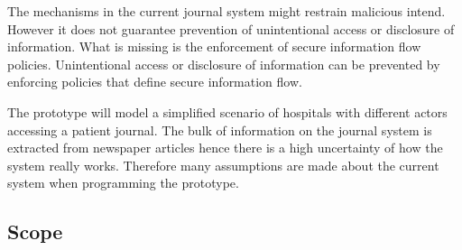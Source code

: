 The mechanisms in the current journal system might restrain malicious intend. However it does not guarantee prevention of unintentional access or disclosure of information\cite{Harman2012}. 
What is missing is the enforcement of secure information flow policies. Unintentional access or disclosure of information can be prevented by enforcing policies that define secure information flow.

The prototype will model a simplified scenario of hospitals with different actors accessing a patient journal. The bulk of information on the journal system is extracted from newspaper articles hence there is a high uncertainty of how the system really works. Therefore many assumptions are made about the current system when programming the prototype.






\subsection{Scope} 


